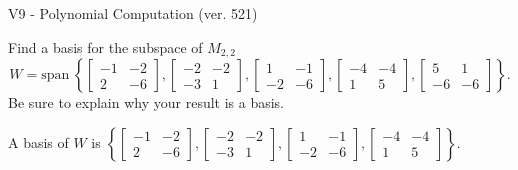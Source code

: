 \begin{exercise}
  \begin{exerciseTitle}V9 - Polynomial Computation (ver. 521)\end{exerciseTitle}
  \begin{exerciseStatement}
    Find a basis for the subspace of \(M_{2,2}\) 
\[W=\mathrm{span}\ \left\{\left[\begin{array}{cc}
-1 & -2 \\
2 & -6
\end{array}\right] , \left[\begin{array}{cc}
-2 & -2 \\
-3 & 1
\end{array}\right] , \left[\begin{array}{cc}
1 & -1 \\
-2 & -6
\end{array}\right] , \left[\begin{array}{cc}
-4 & -4 \\
1 & 5
\end{array}\right] , \left[\begin{array}{cc}
5 & 1 \\
-6 & -6
\end{array}\right]\right\}.\]
 Be sure to explain why your result is a basis.


  \end{exerciseStatement}
  \begin{exerciseAnswer}
   A basis of \(W\) is  \(\left\{\left[\begin{array}{cc}
-1 & -2 \\
2 & -6
\end{array}\right] , \left[\begin{array}{cc}
-2 & -2 \\
-3 & 1
\end{array}\right] , \left[\begin{array}{cc}
1 & -1 \\
-2 & -6
\end{array}\right] , \left[\begin{array}{cc}
-4 & -4 \\
1 & 5
\end{array}\right]\right\}\).
  


  \end{exerciseAnswer}
\end{exercise}